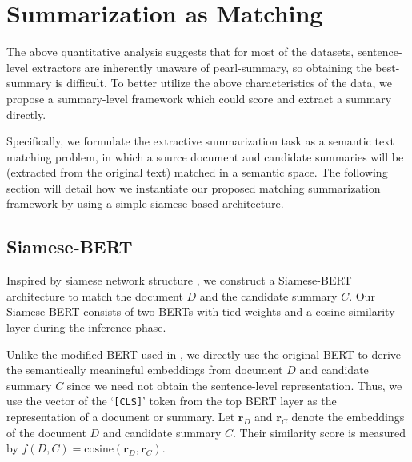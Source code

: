 \section{Summarization as Matching}
\label{sec:model}

The above quantitative analysis suggests that for most of the datasets, sentence-level extractors are inherently unaware of pearl-summary, so obtaining the best-summary is difficult. To better utilize the above characteristics of the data, we propose a summary-level framework which could score and extract a summary directly.

Specifically, we formulate the extractive summarization task as a semantic text matching problem,   in  which  a  source  document and  candidate  summaries  will  be  (extracted from the original text) matched in a semantic space.
The following section will detail how we instantiate our proposed matching summarization framework by using a simple siamese-based architecture.

\subsection{Siamese-BERT}

Inspired by siamese network structure \cite{bromley1994signature}, we construct a Siamese-BERT architecture to match the document $D$ and the candidate summary $C$. Our Siamese-BERT consists of two BERTs with tied-weights and a cosine-similarity layer during the inference phase.

Unlike the modified BERT used in \cite{liu2019fine,bae2019summary}, we directly use the original BERT to derive the semantically meaningful embeddings from document $D$ and candidate summary $C$ since we need not obtain the sentence-level representation.
Thus, we use the vector of the `\texttt{[CLS]}' token from the top BERT layer as the representation of a document or summary.
Let $\mathbf{r}_D$ and $\mathbf{r}_C$ denote the embeddings of the document $D$ and candidate summary $C$. Their similarity score is measured by $f(D,C)=\mathrm{cosine}(\mathbf{r}_D,\mathbf{r}_C)$.

